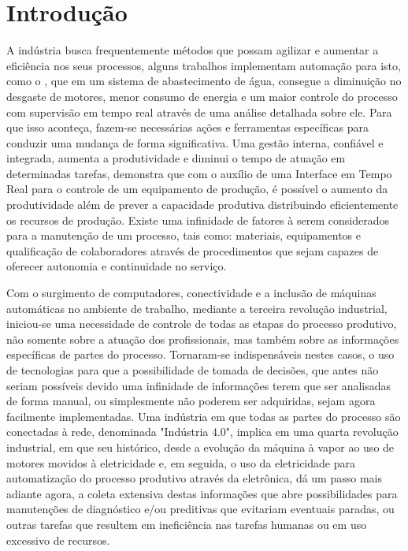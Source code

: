 \chapter{Introdução}
\label{chap:introducao}

A indústria busca frequentemente métodos que possam agilizar e aumentar a eficiência nos seus processos, alguns trabalhos implementam automação para isto, como o \cite{IndustriaEficiencia}, que em um sistema de abastecimento de água, consegue a diminuição no desgaste de motores, menor consumo de energia e um maior controle do processo com supervisão em tempo real através de uma análise detalhada sobre ele. Para que isso aconteça, fazem-se necessárias ações e ferramentas específicas para conduzir uma mudança de forma significativa.
Uma gestão interna, confiável e integrada, aumenta a produtividade e diminui o tempo de atuação em  determinadas tarefas, \cite{InterfaceTempoReal} demonstra que com o auxílio de uma Interface em Tempo Real para o controle de um equipamento de produção, é possível o aumento da produtividade além de prever a capacidade produtiva distribuindo eficientemente os recursos de produção. Existe uma infinidade de fatores à serem considerados para a manutenção de um processo, tais como: materiais, equipamentos e qualificação de colaboradores através de procedimentos que sejam capazes de oferecer autonomia e continuidade no serviço. 

Com o surgimento de computadores, conectividade e a inclusão de máquinas automáticas no ambiente de trabalho, mediante a terceira revolução industrial, iniciou-se uma necessidade de controle de todas as etapas do processo produtivo, não somente sobre a atuação dos profissionais, mas também sobre as informações específicas de partes do processo. Tornaram-se indispensáveis nestes casos, o uso de tecnologias para que a possibilidade de tomada de decisões, que antes não seriam possíveis devido uma infinidade de informações terem que ser analisadas de forma manual, ou simplesmente não poderem ser adquiridas, sejam agora facilmente implementadas. Uma indústria em que todas as partes do processo são conectadas à rede, denominada "Indústria 4.0", implica em uma quarta revolução industrial, em que seu histórico, desde a evolução da máquina à vapor ao uso de motores movidos à eletricidade e, em seguida, o uso da eletricidade para automatização do processo produtivo através da eletrônica, dá um passo mais adiante agora, a coleta extensiva destas informações que abre possibilidades para manutenções de diagnóstico e/ou preditivas que evitariam eventuais paradas, ou outras tarefas que resultem em ineficiência nas tarefas humanas ou em uso excessivo de recursos.

